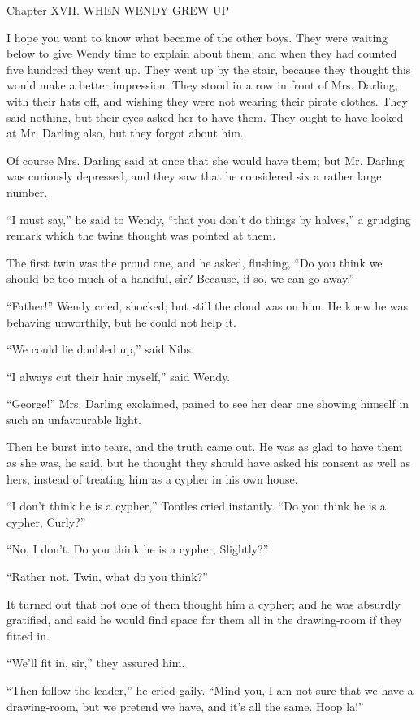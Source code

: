 Chapter XVII.
WHEN WENDY GREW UP


I hope you want to know what became of the other boys. They were
waiting below to give Wendy time to explain about them; and when they
had counted five hundred they went up. They went up by the stair,
because they thought this would make a better impression. They stood in
a row in front of Mrs. Darling, with their hats off, and wishing they
were not wearing their pirate clothes. They said nothing, but their
eyes asked her to have them. They ought to have looked at Mr. Darling
also, but they forgot about him.

Of course Mrs. Darling said at once that she would have them; but Mr.
Darling was curiously depressed, and they saw that he considered six a
rather large number.

``I must say,'' he said to Wendy, ``that you don't do things by halves,'' a
grudging remark which the twins thought was pointed at them.

The first twin was the proud one, and he asked, flushing, ``Do you think
we should be too much of a handful, sir? Because, if so, we can go
away.''

``Father!'' Wendy cried, shocked; but still the cloud was on him. He knew
he was behaving unworthily, but he could not help it.

``We could lie doubled up,'' said Nibs.

``I always cut their hair myself,'' said Wendy.

``George!'' Mrs. Darling exclaimed, pained to see her dear one showing
himself in such an unfavourable light.

Then he burst into tears, and the truth came out. He was as glad to
have them as she was, he said, but he thought they should have asked
his consent as well as hers, instead of treating him as a cypher in his
own house.

``I don't think he is a cypher,'' Tootles cried instantly. ``Do you think
he is a cypher, Curly?''

``No, I don't. Do you think he is a cypher, Slightly?''

``Rather not. Twin, what do you think?''

It turned out that not one of them thought him a cypher; and he was
absurdly gratified, and said he would find space for them all in the
drawing-room if they fitted in.

``We'll fit in, sir,'' they assured him.

``Then follow the leader,'' he cried gaily. ``Mind you, I am not sure that
we have a drawing-room, but we pretend we have, and it's all the same.
Hoop la!''

